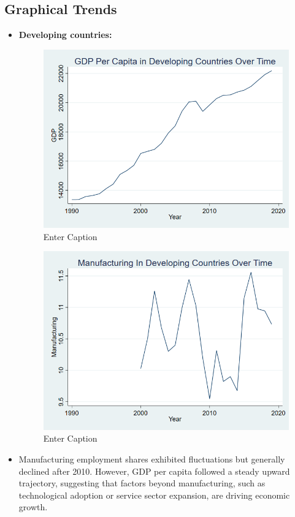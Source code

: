 \documentclass[12pt]{article}
\begin{document}
\subsection{Graphical Trends}


\begin{itemize}
\item \textbf{Developing countries:} 
\begin{figure}
    \centering
    \includegraphics[width=0.5\linewidth]{GDP DEVELOPING GRAPH.png}
    \caption{Enter Caption}
    \label{fig:enter-label}
\end{figure}
\begin{figure}
    \centering
    \includegraphics[width=0.5\linewidth]{FINAL GRAPH MFT DEVELOPING.png}
    \caption{Enter Caption}
    \label{fig:enter-label}
\end{figure}
\item Manufacturing employment shares exhibited fluctuations but generally declined after 2010. However, GDP per capita followed a steady upward trajectory, suggesting that factors beyond manufacturing, such as technological adoption or service sector expansion, are driving economic growth.


\end{itemize}
\end{document}
